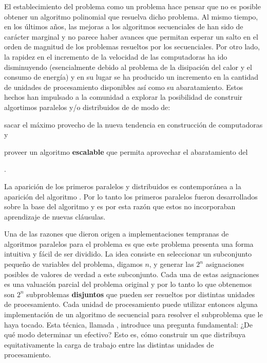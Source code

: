 El establecimiento del problema \sat como un problema \npc hace pensar que no es
posible obtener un algoritmo polinomial que resuelva dicho problema. Al mismo
tiempo, en los últimos años, las mejoras a los algoritmos secuenciales de
\ssolving han sido de carácter marginal y no parece haber avances que permitan
esperar un salto en el orden de magnitud de los problemas resueltos por los
\ssolvers secuenciales. Por otro lado, la rapidez en el incremento de la
velocidad de las computadoras ha ido disminuyendo (esencialmente debido al
problema de la disipación del calor y el consumo de energía)  y en su lugar se ha producido un
incremento en la cantidad de unidades de procesamiento disponibles así como su
abaratamiento. Estos hechos han impulsado a la comunidad \sat a explorar la
posibilidad de construir algortimos paralelos y/o distribuidos de \ssolving de
modo de: \begin{inparaenum}[a)]  \item sacar el máximo provecho de la nueva
tendencia en construcción de computadoras y  \item proveer un algoritmo
\textbf{escalable} que permita aprovechar el abaratamiento del \hard
\end{inparaenum}.

La aparición de los primeros \ssolvers paralelos y distribuidos
\cite{bohm:1996:afast, zhang:jsc-1996} es contemporánea a la aparición del
algoritmo \CDCL. Por lo tanto los primeros \ssolvers paralelos fueron
desarrollados sobre la base del algoritmo \dpll y es por esta razón que estos
\ssolvers no incorporaban aprendizaje de nuevas cláusulas.

Una de las razones que dieron origen a implementaciones tempranas de
algoritmos paralelos para el problema \sat es que este problema presenta una
forma intuitiva y fácil de ser dividido. La idea consiste en seleccionar un
subconjunto pequeño de variables del problema, digamos $n$, y generar las
$2^n$ asignaciones posibles de valores de verdad a este subconjunto. Cada una
de estas asignaciones es una valuación parcial del problema original y por lo
tanto lo que obtenemos son $2^n$ subproblemas \textbf{disjuntos} que pueden
ser resueltos por distintas unidades de procesamiento. Cada unidad de
procesamiento puede utilizar entonces alguna implementación de un algoritmo de
\ssolving secuencial para resolver el subproblema que le haya tocado. Esta
técnica, llamada \gp\cite{zhang:jsc-1996}, introduce una pregunta fundamental:
¿De qué modo determinar un \gp efectivo? Esto es, cómo construir un \gp que
distribuya equitativamente la carga de trabajo entre las distintas unidades de
procesamiento.

